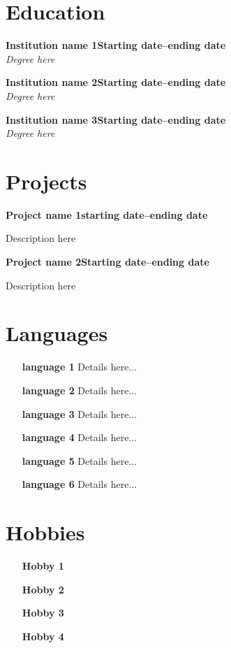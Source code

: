 \documentclass[letterpaper,10pt]{article}
\newcommand{\heading}[2]{
  \hspace{10pt}#1\hfill#2\\
}
\newcommand{\headingBf}[2]{
  \heading{\textbf{#1}}{\textbf{#2}}
}
\newcommand{\headingIt}[2]{
  \heading{\textit{#1}}{\textit{#2}}
}
\newenvironment{resume_list}{
  \vspace{-7pt}
  \begin{itemize}[itemsep=-2px, parsep=1pt, leftmargin=30pt]
}{
  \end{itemize}
}
\begin{document}
  \section{Education }

  \headingBf{Institution name 1}{Starting date--ending date}
  \headingIt{Degree here}{}
  

  \vspace{5pt}
  \headingBf{Institution name 2}{Starting date--ending date}
  \headingIt{Degree here}{}
  

  \vspace{5pt}
  \headingBf{Institution name 3}{Starting date--ending date}
  \headingIt{Degree here}{}
  

  \vspace{5pt}

 
  \section{Projects}

  \headingBf{Project name 1}{starting date--ending date}
  \begin{resume_list}
    \item Description here

  \end{resume_list}

  \headingBf{Project name 2}{Starting date--ending date}
  \begin{resume_list}
    \item Description here

  \end{resume_list}
  
   \section{Languages}

  \begin{multicols}{2}
    \begin{itemize}[itemsep=-2px, parsep=1pt, leftmargin=75pt]
      \item[\textbf{language 1}] Details here...
      \item[\textbf{language 2}] Details here...
      \item[\textbf{language 3}] Details here...
      \item[\textbf{language 4}] Details here...
      \item[\textbf{language 5}] Details here...
      \item[\textbf{language 6}] Details here...
    \end{itemize}
  \end{multicols}

  \section{Hobbies}

  \begin{multicols}{2}
    \begin{itemize}[itemsep=-2px, parsep=1pt, leftmargin=75pt]
      \item[\textbf{Hobby 1}] 
      \item[\textbf{Hobby 2}] 
      \item[\textbf{Hobby 3}] 
      \item[\textbf{Hobby 4}] 
     
    \end{itemize}
  \end{multicols}
\end{document}
